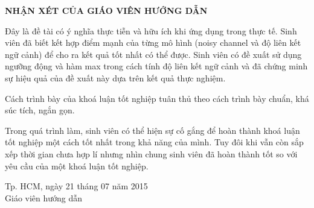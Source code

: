 \begin{titlepage}

\begin{center}
\textbf{NHẬN XÉT CỦA GIÁO VIÊN HƯỚNG DẪN}\\

\end{center}

Đây là đề tài có ý nghĩa thực tiễn và hữu ích khi ứng dụng trong thực tế.
Sinh viên đã biết kết hợp điểm mạnh của từng mô hình (noisy channel và độ liên kết ngữ cảnh) để cho ra kết quả tốt nhất có thể được.
Sinh viên có đề xuất sử dụng ngưỡng động và hàm max trong cách tính độ liên kết ngữ cảnh và đã chứng minh sự hiệu quả của đề xuất này dựa trên kết quả thực nghiệm.

Cách trình bày của khoá luận tốt nghiệp tuân thủ theo cách trình bày chuẩn, khá súc tích, ngắn gọn.

Trong quá trình làm, sinh viên có thể hiện sự cố gắng để hoàn thành khoá luận tốt nghiệp một cách tốt nhất trong khả năng của mình. Tuy đôi khi vẫn còn sắp xếp thời gian chưa hợp lí nhưng nhìn chung sinh viên đã hoàn thành tốt so với yêu cầu của một khoá luận tốt nghiệp.


\vfill

\begin{center}
\leavevmode{\parindent=6em\indent} Tp. HCM, ngày 21 tháng 07 năm 2015\\
\leavevmode{\parindent=6em\indent} Giáo viên hướng dẫn\\[2cm]
\leavevmode{\parindent=6em\indent} \tenGVHD
\end{center}

\end{titlepage}